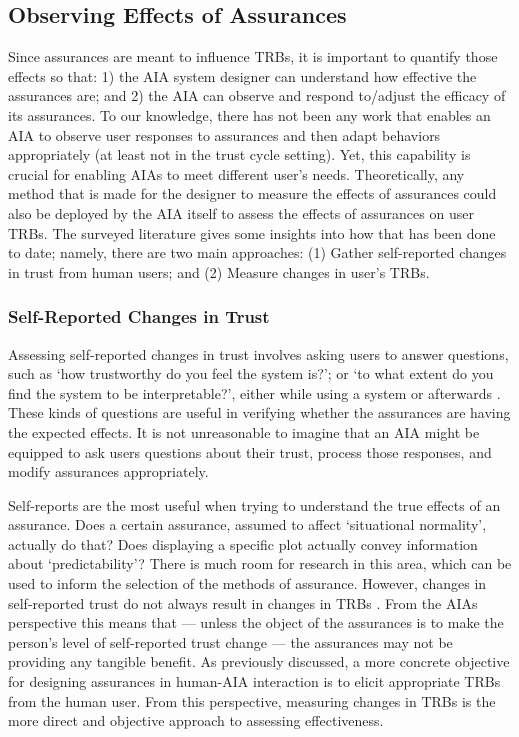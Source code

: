\subsection{Observing Effects of Assurances} \label{sec:measuring_effects}
    Since assurances are meant to influence TRBs, it is important to quantify those effects so that:  1) the AIA system designer can understand how effective the assurances are; and 2) the AIA can observe and respond to/adjust the efficacy of its assurances. To our knowledge, there has not been any work that enables an AIA to observe user responses to assurances and then adapt behaviors appropriately (at least not in the trust cycle setting). 
    Yet, this capability is crucial for enabling AIAs to meet different user's needs. 
Theoretically, any method that is made for the designer to measure the effects of assurances could also be deployed by the AIA itself to assess the effects of assurances on user TRBs. 
The surveyed literature gives some insights into how that has been done to date; namely, there are two main approaches: (1)  Gather self-reported changes in trust from human users; and (2) Measure changes in user's TRBs. 
    
\subsubsection{Self-Reported Changes in Trust} Assessing self-reported changes in trust involves asking users to answer questions, such as `how trustworthy do you feel the system is?'; or `to what extent do you find the system to be interpretable?', either while using a system or afterwards \cite{Mcknight2011-gv,Muir1996-gt,Wickens1999-la,Salem2015-md,Kaniarasu2013-ho}. These kinds of questions are useful in verifying whether the assurances are having the expected effects. It is not unreasonable to imagine that an AIA might be equipped to ask users questions about their trust, process those responses, and modify assurances appropriately.

Self-reports are the most useful when trying to understand the true effects of an assurance. Does a certain assurance, assumed to affect `situational normality', actually do that? 
Does displaying a specific plot actually convey information about `predictability'? 
There is much room for research in this area, which can be used to inform the selection of the methods of assurance. 
However, changes in self-reported trust do not always result in changes in TRBs \cite{Dzindolet2003-ts}. From the AIAs perspective this means that --- unless the object of the assurances is to make the person's level of self-reported trust change --- the assurances may not be providing any tangible benefit. 
As previously discussed, a more concrete objective for designing assurances in human-AIA interaction is to elicit appropriate TRBs from the human user. 
From this perspective, measuring changes in TRBs is the more direct and objective approach to assessing effectiveness.%

